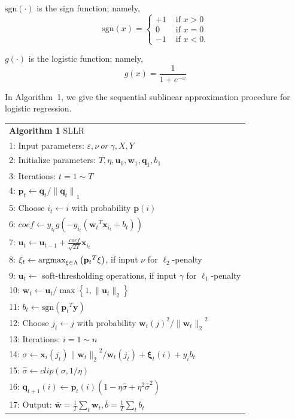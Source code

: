 \documentclass[10pt, conference, compsocconf]{IEEEtran}
\newcommand{\bw}{\mathbf{w}}
\newcommand{\bu}{\mathbf{u}}
\newcommand{\bp}{\mathbf{p}}
\newcommand{\bq}{\mathbf{q}}
\newcommand{\bxi}{\mathbf{\xi}}
\newcommand{\lc}{\left(}
\newcommand{\rc}{\right)}
\newcommand{\li}{\lc i\rc}
\newcommand{\lj}{\lc j\rc}
\newcommand{\tspace}{\hspace*{2em}}
\newcommand{\tspaces}{\hspace*{1.5em}}
\def\argmax{\mathop{\rm argmax}}
\def\sgn{\mathrm{sgn}}
\begin{document}
$\sgn \lc \cdot \rc$ is the sign function; namely,
\[
\sgn \lc x \rc =
\begin{cases}
	+1 & \text{ if } x>0  \\
	0  & \text{ if } x=0  \\
	-1 & \text{ if } x<0.
\end{cases}
\]

$g\lc \cdot \rc$ is the logistic function; namely,
\[
g \lc x \rc=\frac{1}{1+e^{-x}}
\]

In Algorithm~1, we give the sequential sublinear approximation procedure for logistic regression.	
	\begin{table} [ht]
	\begin{tabular}{l}
	\hline\noalign{\smallskip}
	\textbf{Algorithm 1} SLLR \\
	\noalign{\smallskip}
	\hline
	\noalign{\smallskip}
	1:	Input parameters: $\varepsilon, \nu~or~\gamma, X, Y$ \\
	2:	Initialize parameters: $T, \eta, {\mathbf{u}}_{0}, {\bw}_{1}, {\mathbf{\bq}}_{1}, {b}_{1}$\\
	3:	Iterations: $t=1 \sim T$ \\
	4:	\tspace ${\bp}_{t}\leftarrow{\bq}_{t}/{\|{\bq}_{t}\|}_{1}$ \\
	5:  \tspace Choose ${i}_{t}\leftarrow i$ with probability $\bp(i)$ \\
	6:	\tspace $coef\leftarrow{y}_{{i}_{t}}g\lc-{y}_{{i}_{t}}\lc {{\bw}_{t}}^{T}{\mathbf{x}}_{i_t}+{b}_{t} \rc\rc$ \\
	7:	\tspace ${\bu}_{t}\leftarrow {\bu}_{t-1}+\frac{coef}{\sqrt{2T}}{\mathbf{x}}_{{i}_{t}}$ \\
    8:  \tspace ${\bxi}_{t}\leftarrow \argmax_{\bxi\in \Lambda}\lc{{\bp}_{t}}^{T}\bxi\rc$, if input $\nu$ for $\ell_2$-penalty \\
    9:  \tspace $\bu_t\leftarrow$ soft-thresholding operations, if input $\gamma$ for $\ell_1$-penalty \\
	10:	\tspaces ${\bw}_{t}\leftarrow {\bu}_{t}/\max \left\{1,\|{\bu}_{t}\|_2 \right\}$ \\
    11: \tspaces ${b}_{t}\leftarrow \sgn\lc {{\bp}_{t}}^{T}\mathbf{y}\rc$ \\
	12:	\tspaces Choose ${j}_{t}\leftarrow j$ with probability ${{\bw}_{t}\lj}^{2}/{\|{\bw}_{t}\|_2}^{2} $ \\
	13:	\tspaces Iterations: $i=1 \sim n$ \\
	14:	\tspaces\tspace $\sigma \leftarrow \mathbf{x}_{i} \lc {j}_{t}\rc{\|{\bw}_{t}\|_2}^{2}/{\bw}_{t}\lc {j}_{t} \rc+{\bxi}_{t}\li+{y}_{i}{b}_{t}$ \\
	15:	\tspaces\tspace $\hat{\sigma} \leftarrow clip\lc \sigma,1/\eta \rc$ \\
	16:	\tspaces\tspace ${\bq}_{t+1}\li \leftarrow {\bp}_{t}\li\lc 1-\eta\hat{\sigma} + {\eta}^{2}{\hat{\sigma}}^{2} \rc$ \\
	17:	Output: $\bar{\bw}=\frac{1}{T}\sum_{t}{\bw}_{t},\bar{b}=\frac{1}{T}\sum_{t}{b}_{t}$ \\
	\hline
	\end{tabular} 	
	\label{alg:1}
	\end{table}
\end{document}
